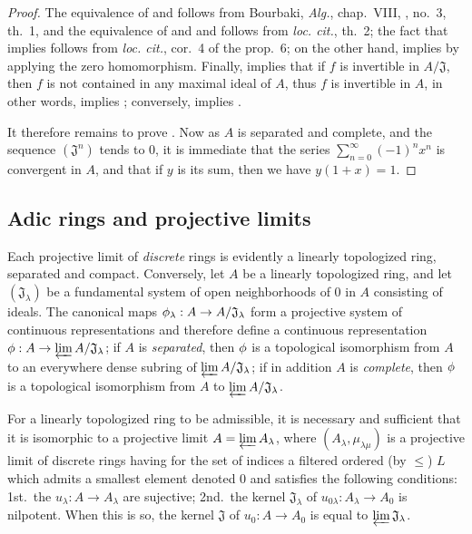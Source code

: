 \begin{proof}
The equivalence of  and 
follows from Bourbaki, \emph{Alg.}, chap.~VIII, , no.~3,
th.~1, and the equivalence of  and
 and  follows from
\emph{loc. cit.}, th.~2; the fact that  implies
 follows from \emph{loc. cit.},
cor.~4 of the prop.~6; on the other hand,  implies
 by applying the zero homomorphism. Finally,
 implies that if $f$ is invertible in $A/\mathfrak{J}$,
then $f$ is not contained in any maximal ideal of $A$, thus $f$ is invertible in $A$,
in other words,  implies ;
conversely,  implies .

It therefore remains to prove . Now as $A$ is separated and
complete, and the sequence $(\mathfrak{J}^n)$ tends to $0$, it is immediate that
the series $\sum_{n=0}^\infty(-1)^n x^n$ is convergent in $A$, and that if $y$
is its sum, then we have $y(1+x)=1$.
\end{proof}

\subsection{Adic rings and projective limits}
\label{subsection:0.7.2}

\begin{env}[7.2.1]
\label{0.7.2.1}
Each projective limit of \emph{discrete} rings is evidently a linearly
topologized ring, separated and compact. Conversely, let $A$ be a linearly
topologized ring, and let $(\mathfrak{J}_\lambda)$ be a fundamental system of
open neighborhoods of $0$ in $A$ consisting of
ideals. The canonical maps $\vphi_\lambda:A\to A/\mathfrak{J}_\lambda$ form
a projective system of continuous representations and therefore define a
continuous representation $\vphi:A\to\varprojlim A/\mathfrak{J}_\lambda$; if $A$
is \emph{separated}, then $\phi$ is a topological isomorphism from $A$ to an
everywhere dense subring of $\varprojlim A/\mathfrak{J}_\lambda$; if in
addition $A$ is \emph{complete}, then $\phi$ is a topological isomorphism from
$A$ to $\varprojlim A/\mathfrak{J}_\lambda$.
\end{env}

\begin{lemma}[7.2.2]
\label{0.7.2.2}
For a linearly topologized ring to be admissible, it is necessary and sufficient
that it is isomorphic to a projective limit $A=\varprojlim A_\lambda$, where
$(A_\lambda,\mu_{\lambda\mu})$ is a projective limit of discrete rings having
for the set of indices a filtered ordered (by $\leq$) $L$ which admits
a smallest element denoted $0$ and satisfies the following conditions:
1st.~the $u_\lambda:A\to A_\lambda$ are sujective;
2nd.~the kernel $\mathfrak{J}_\lambda$ of
$u_{0\lambda}:A_\lambda\to A_0$ is nilpotent. When this is so, the kernel
$\mathfrak{J}$ of $u_0:A\to A_0$ is equal to $\varprojlim\mathfrak{J}_\lambda$.
\end{lemma}

